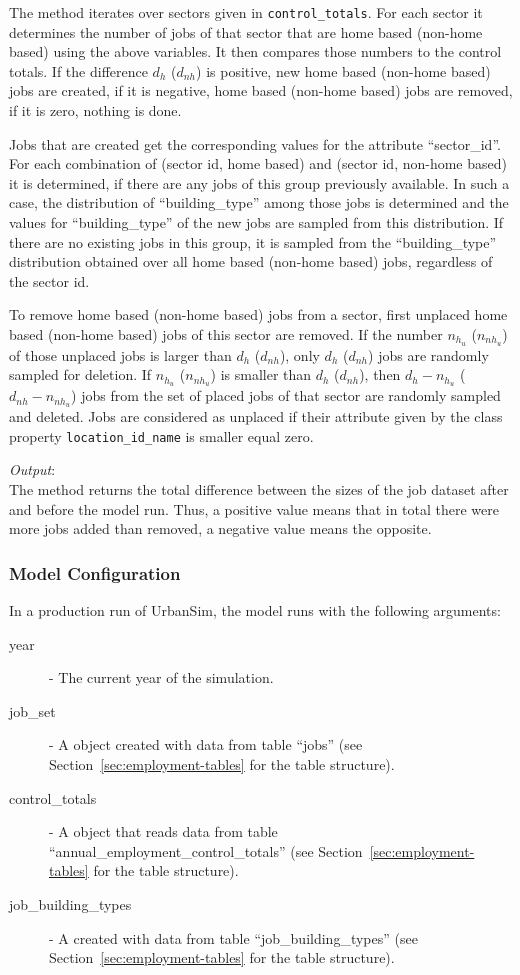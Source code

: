 The method iterates over sectors given in \verb|control_totals|. For each
sector it determines the number of jobs of that sector that are home based
(non-home based) using the above variables. \variablesindex It then compares those numbers to
the control totals.  If the difference $d_h$ ($d_{nh}$) is positive, new home
based (non-home based) jobs are created, if it is negative, home based
(non-home based) jobs are removed, if it is zero, nothing is done.

Jobs that are created get the corresponding values for the attribute \attributesindex
``sector_id''. For each combination of (sector id, home based) and (sector id, non-home based) 
it is determined, if there are any jobs of this group
previously available. In such a case, the distribution of ``building_type'' among those jobs is
determined and the values for ``building_type'' of the new jobs are sampled
from this distribution. If there are no existing jobs in this group, it is
sampled from the ``building_type'' distribution obtained over all home based
(non-home based) jobs, regardless of the sector id.

To remove home based (non-home based) jobs from a sector, first unplaced home
based (non-home based) jobs of this sector are removed. If the number $n_{h_u}$
($n_{nh_u}$) of those unplaced jobs is larger than $d_h$ ($d_{nh}$), only
$d_h$ ($d_{nh}$) jobs are randomly sampled for deletion. If $n_{h_u}$
($n_{nh_u}$) is smaller than $d_h$ ($d_{nh}$), then $d_h-n_{h_u}$
($d_{nh}-n_{nh_u}$) jobs from the set of placed jobs of that sector are
randomly sampled and deleted. Jobs are considered as unplaced if their
attribute \attributesindex given by the class property \verb|location_id_name| is smaller equal zero.

{\it Output}:~\\[1mm]
The method returns the total difference between the sizes of the job
dataset \datasetindex after and before the model \modelsindex run. Thus, a positive value means that in
total there were more jobs added than removed, a negative value means
the opposite.

\subsubsection{Model Configuration}
\modelsindex
%
In a production run of UrbanSim, the model \modelsindex runs with the following arguments:
\begin{description}
\item[year] - The current year of the simulation.
\item[job_set] - A  object created with data from
  table ``jobs'' (see Section~\ref{sec:employment-tables}
  for the table structure).
\item[control_totals] - A  object  that reads data from table
  ``annual_employment_control_totals'' (see
  Section~\ref{sec:employment-tables} for the table structure).
\item[job_building_types] - A  created with data from table 
``job_building_types'' (see Section~\ref{sec:employment-tables}
  for the table structure).
\end{description}

